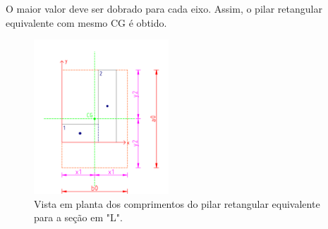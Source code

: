 O maior valor deve ser dobrado para cada eixo. Assim, o pilar retangular equivalente com mesmo CG é obtido.

\begin{figure}[H]
	\begin{center}
	\caption{Vista em planta dos comprimentos do pilar retangular equivalente para a seção em "L".}
    	\includegraphics[width=0.45\textwidth]{Fundacoes-rasas-ou-diretas/Imagens/Sapatas-com-secao-LUZ-5.png}
	\end{center}
\end{figure}